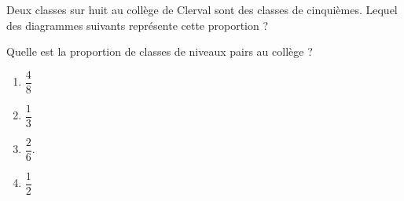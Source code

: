 
\begin{exercice}\label{exosmath-0857}

    Deux classes sur huit au collège de Clerval sont des classes de cinquièmes. Lequel des diagrammes suivants représente cette proportion ?

\begin{center}
   
   
   
\end{center}
Quelle est la proportion de classes de niveaux pairs au collège ?
\begin{multicols}{4}
    \begin{enumerate}
        \item
            \( \dfrac{ 4 }{ 8 }\)
        \item
            \( \dfrac{ 1 }{ 3 }\)
        \item
            \( \dfrac{ 2 }{ 6 }\).
        \item
            \( \dfrac{ 1 }{ 2 }\)
    \end{enumerate}
\end{multicols}

\end{exercice}
